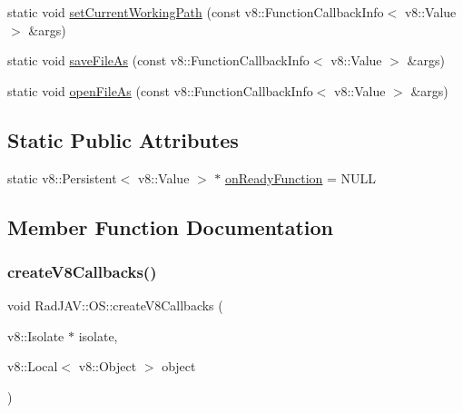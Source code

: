 \begin{DoxyCompactItemize}
\item 
static void \mbox{\hyperlink{class_rad_j_a_v_1_1_o_s_ab4df37b944954948da9712f64fba21e9}{set\+Current\+Working\+Path}} (const v8\+::\+Function\+Callback\+Info$<$ v8\+::\+Value $>$ \&args)
\item 
static void \mbox{\hyperlink{class_rad_j_a_v_1_1_o_s_a64c1908e9fb3868e9ae9fe472e875fb2}{save\+File\+As}} (const v8\+::\+Function\+Callback\+Info$<$ v8\+::\+Value $>$ \&args)
\item 
static void \mbox{\hyperlink{class_rad_j_a_v_1_1_o_s_ad364693e2c5006a106bee573ae1f2a2f}{open\+File\+As}} (const v8\+::\+Function\+Callback\+Info$<$ v8\+::\+Value $>$ \&args)
\end{DoxyCompactItemize}
\subsection*{Static Public Attributes}
\begin{DoxyCompactItemize}
\item 
static v8\+::\+Persistent$<$ v8\+::\+Value $>$ $\ast$ \mbox{\hyperlink{class_rad_j_a_v_1_1_o_s_a6f438f99b6903c452bf8a2aeb24e6be7}{on\+Ready\+Function}} = N\+U\+LL
\end{DoxyCompactItemize}


\subsection{Member Function Documentation}
\mbox{\label{class_rad_j_a_v_1_1_o_s_aae5cf6fa6bc766aa0f807b1e1234c6e3}} 
\subsubsection{\texorpdfstring{create\+V8\+Callbacks()}{createV8Callbacks()}}
{\footnotesize\ttfamily void Rad\+J\+A\+V\+::\+O\+S\+::create\+V8\+Callbacks (\begin{DoxyParamCaption}\item[{v8\+::\+Isolate $\ast$}]{isolate,  }\item[{v8\+::\+Local$<$ v8\+::\+Object $>$}]{object }\end{DoxyParamCaption})\hspace{0.3cm}{\ttfamily [static]}}

